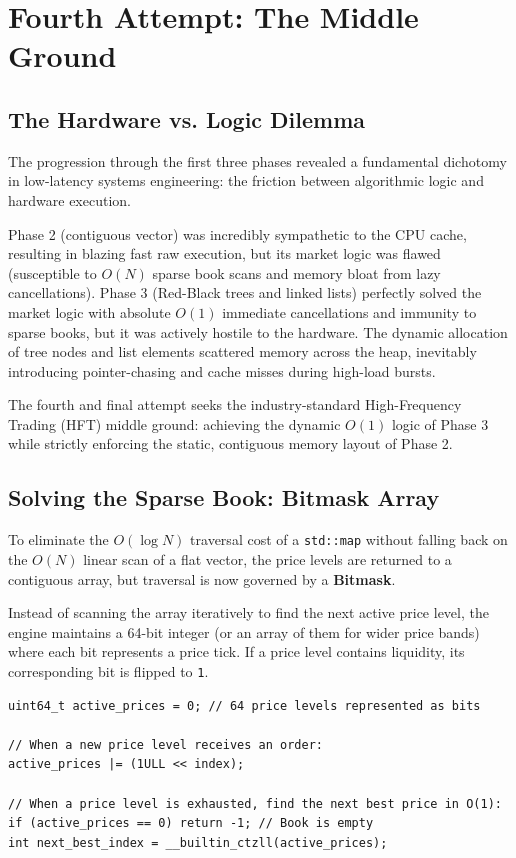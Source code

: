 \documentclass{article}
\begin{document}
\section{Fourth Attempt: The Middle Ground}

\subsection{The Hardware vs. Logic Dilemma}
The progression through the first three phases revealed a fundamental dichotomy in low-latency systems engineering: the friction between algorithmic logic and hardware execution. 

Phase 2 (contiguous vector) was incredibly sympathetic to the CPU cache, resulting in blazing fast raw execution, but its market logic was flawed (susceptible to $O(N)$ sparse book scans and memory bloat from lazy cancellations). Phase 3 (Red-Black trees and linked lists) perfectly solved the market logic with absolute $O(1)$ immediate cancellations and immunity to sparse books, but it was actively hostile to the hardware. The dynamic allocation of tree nodes and list elements scattered memory across the heap, inevitably introducing pointer-chasing and cache misses during high-load bursts.

The fourth and final attempt seeks the industry-standard High-Frequency Trading (HFT) middle ground: achieving the dynamic $O(1)$ logic of Phase 3 while strictly enforcing the static, contiguous memory layout of Phase 2.

\subsection{Solving the Sparse Book: Bitmask Array}
To eliminate the $O(\log N)$ traversal cost of a \texttt{std::map} without falling back on the $O(N)$ linear scan of a flat vector, the price levels are returned to a contiguous array, but traversal is now governed by a \textbf{Bitmask}.

Instead of scanning the array iteratively to find the next active price level, the engine maintains a 64-bit integer (or an array of them for wider price bands) where each bit represents a price tick. If a price level contains liquidity, its corresponding bit is flipped to \texttt{1}.

\begin{lstlisting}[caption={Bitmask Next-Price Discovery}]
uint64_t active_prices = 0; // 64 price levels represented as bits

// When a new price level receives an order:
active_prices |= (1ULL << index);

// When a price level is exhausted, find the next best price in O(1):
if (active_prices == 0) return -1; // Book is empty
int next_best_index = __builtin_ctzll(active_prices); 
\end{lstlisting}
\end{document}

